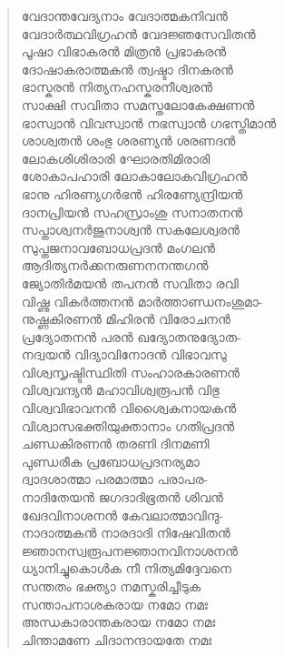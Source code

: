 \begin{verse}
വേദാന്തവേദ്യനാം വേദാത്മകനിവന്‍\\
വേദാര്‍ത്ഥവിഗ്രഹന്‍ വേദജ്ഞസേവിതന്‍\\
പൂഷാ വിഭാകരന്‍ മിത്രന്‍ പ്രഭാകരന്‍\\
ദോഷാകരാത്മകന്‍ ത്വഷ്ടാ ദിനകരന്‍\\
ഭാസ്കരന്‍ നിത്യനഹസ്കരനീശ്വരന്‍\\
സാക്ഷി സവിതാ സമസ്തലോകേക്ഷണന്‍\\
ഭാസ്വാന്‍ വിവസ്വാന്‍ നഭസ്വാന്‍ ഗഭസ്തിമാന്‍\\
ശാശ്വതന്‍ ശംഭു ശരണ്യന്‍ ശരണദന്‍\\
ലോകശിശിരാരി ഘോരതിമിരാരി\\
ശോകാപഹാരി ലോകാലോകവിഗ്രഹന്‍\\
ഭാനു ഹിരണ്യഗര്‍ഭന്‍ ഹിരണ്യേന്ദ്രിയന്‍\\
ദാനപ്രിയന്‍ സഹസ്രാംശു സനാതനന്‍\\
സപ്താശ്വനര്‍ജുനാശ്വന്‍ സകലേശ്വരന്‍\\
സുപ്തജനാവബോധപ്രദന്‍ മംഗലന്‍\\
ആദിത്യനര്‍ക്കനരുണനനന്തഗന്‍\\
ജ്യോതിര്‍മയന്‍ തപനന്‍ സവിതാ രവി\\
വിഷ്ണു വികര്‍ത്തനന്‍ മാര്‍ത്താണ്ഡനംശുമാ-\\
നുഷ്ണകിരണന്‍ മിഹിരന്‍ വിരോചനന്‍\\
പ്രദ്യോതനന്‍ പരന്‍ ഖദ്യോതനുദ്യോത-\\
നദ്വയന്‍ വിദ്യാവിനോദന്‍ വിഭാവസു\\
വിശ്വസൃഷ്ടിസ്ഥിതി സംഹാരകാരണന്‍\\
വിശ്വവന്ദ്യന്‍ മഹാവിശ്വരൂപന്‍ വിഭു\\
വിശ്വവിഭാവനന്‍ വിശ്വൈകനായകന്‍\\
വിശ്വാസഭക്തിയുക്താനാം ഗതിപ്രദന്‍\\
ചണ്ഡകിരണന്‍ തരണി ദിനമണി\\
പുണ്ഡരീക പ്രബോധപ്രദനര്യമാ\\
ദ്വാദശാത്മാ പരമാത്മാ പരാപര-\\
നാദിതേയന്‍ ജഗദാദിഭൂതന്‍ ശിവന്‍\\
ഖേദവിനാശനന്‍ കേവലാത്മാവിന്ദു-\\
നാദാത്മകന്‍ നാരദാദി നിഷേവിതന്‍\\
ജ്ഞാനസ്വരൂപനജ്ഞാനവിനാശനന്‍\\
ധ്യാനിച്ചുകൊള്‍ക നീ നിത്യമിദ്ദേവനെ\\
സന്തതം ഭക്ത്യാ നമസ്കരിച്ചീടുക\\
സന്താപനാശകരായ നമോ നമഃ\\
അന്ധകാരാന്തകരായ നമോ നമഃ\\
ചിന്താമണേ ചിദാനന്ദായതേ നമഃ\\

\end{verse}
